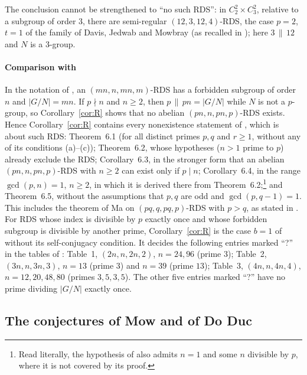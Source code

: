 The conclusion cannot be strengthened to ``no such RDS'': in
$C_2^2\times C_3^2$, relative to a subgroup of order $3$, there are
semi-regular $(12,3,12,4)$-RDS, the case $p=2$, $t=1$ of the family of
Davis, Jedwab and Mowbray \cite{DavisJedwabMowbray1998} (as recalled in
\cite[Sect.~1]{LeungSchmidtZhang2023}); here $3\,\|\,12$ and $N$ is a
$3$-group.

\paragraph{Comparison with \cite{LeungSchmidtZhang2023}}
In the notation of \cite{LeungSchmidtZhang2023}, an $(mn,n,mn,m)$-RDS
has a forbidden subgroup of order $n$ and $|G/N|=mn$. If $p\nmid n$ and
$n\ge2$, then $p\,\|\,pn=|G/N|$ while $N$ is not a $p$-group, so
Corollary~\ref{cor:R} shows that no abelian $(pn,n,pn,p)$-RDS exists.
Hence Corollary~\ref{cor:R} contains every nonexistence statement of
\cite[Sect.~6]{LeungSchmidtZhang2023}, which is about such RDS:
Theorem~6.1 (for all distinct primes $p,q$ and $r\ge1$, without any of
its conditions (a)--(c)); Theorem~6.2, whose hypotheses ($n>1$ prime to
$p$) already exclude the RDS; Corollary~6.3, in the stronger form that an
abelian $(pn,n,pn,p)$-RDS with $n\ge2$ can exist only if $p\mid n$;
Corollary~6.4, in the range $\gcd(p,n)=1$, $n\ge2$, in which it is
derived there from Theorem~6.2;\footnote{Read literally, the hypothesis
of \cite[Cor.~6.4]{LeungSchmidtZhang2023} also admits $n=1$ and some $n$
divisible by $p$, where it is not covered by its proof.} and Theorem~6.5,
without the assumptions that $p,q$ are odd and $\gcd(p,q-1)=1$. This
includes the theorem of Ma \cite{Ma1996} on $(pq,q,pq,p)$-RDS with
$p>q$, as stated in \cite[Sect.~1]{LeungSchmidtZhang2023}. For RDS
whose index is divisible by $p$ exactly once and whose forbidden subgroup
is divisible by another prime, Corollary~\ref{cor:R} is the case $b=1$ of
\cite[Thm.~5.1(a)]{LeungSchmidtZhang2023} without its self-conjugacy
condition. It decides the following entries marked ``?'' in the tables of
\cite{LeungSchmidtZhang2023}: Table~1, $(2n,n,2n,2)$, $n=24,96$ (prime
$3$); Table~2, $(3n,n,3n,3)$, $n=13$ (prime $3$) and $n=39$ (prime $13$);
Table~3, $(4n,n,4n,4)$, $n=12,20,48,80$ (primes $3,5,3,5$). The other
five entries marked ``?'' have no prime dividing $|G/N|$ exactly once.

\subsection{The conjectures of Mow and of Do Duc}

